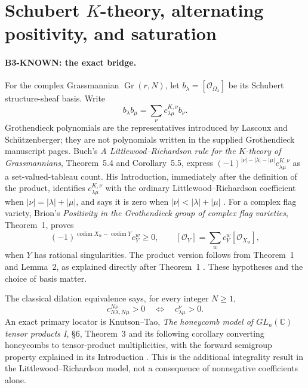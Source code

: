 
\section{Schubert $K$-theory, alternating positivity, and saturation}
\label{sec:bridge-k}

\paragraph{B3-KNOWN: the exact bridge.}
For the complex Grassmannian $\operatorname{Gr}(r,N)$, let
$b_\lambda=[\mathcal O_{\Omega_\lambda}]$ be its Schubert structure-sheaf
basis.  Write
\[
 b_\lambda b_\mu=\sum_\nu c^{K,\nu}_{\lambda\mu}b_\nu.
\]
Grothendieck polynomials are the representatives introduced by Lascoux and
Sch\"utzenberger; they are not polynomials written in the supplied
Grothendieck manuscript pages.  Buch's \emph{A Littlewood--Richardson rule
for the $K$-theory of Grassmannians}, Theorem~5.4 and Corollary~5.5,
express $(-1)^{|\nu|-|\lambda|-|\mu|}c^{K,\nu}_{\lambda\mu}$ as a
set-valued-tableau count.  His Introduction, immediately after the
definition of the product, identifies $c^{K,\nu}_{\lambda\mu}$ with the
ordinary Littlewood--Richardson coefficient when
$|\nu|=|\lambda|+|\mu|$, and says it is zero when
$|\nu|<|\lambda|+|\mu|$ \cite{buch2002}.
For a complex flag variety, Brion's \emph{Positivity in the Grothendieck
group of complex flag varieties}, Theorem~1, proves
\[
 (-1)^{\operatorname{codim}X_w-\operatorname{codim}Y}
 c_Y^w\geq0,
 \qquad [\mathcal O_Y]=\sum_w c_Y^w[\mathcal O_{X_w}],
\]
when $Y$ has rational singularities.  The product version follows from
Theorem~1 and Lemma~2, as explained directly after Theorem~1
\cite{brion2002}.  These hypotheses and the choice of basis matter.

The classical dilation equivalence says, for every integer $N\geq1$,
\[
 c_{N\lambda,N\mu}^{N\nu}>0
 \quad\Longleftrightarrow\quad c_{\lambda\mu}^{\nu}>0.
\]
An exact primary locator is Knutson--Tao, \emph{The honeycomb model of
$GL_n(\mathbb C)$ tensor products I}, \S6, Theorem~3 and its following
corollary converting honeycombs to tensor-product multiplicities,
with the forward semigroup property explained in its Introduction
\cite{kt1999}.  This is the additional integrality result in the
Littlewood--Richardson model, not a consequence of nonnegative
coefficients alone.

